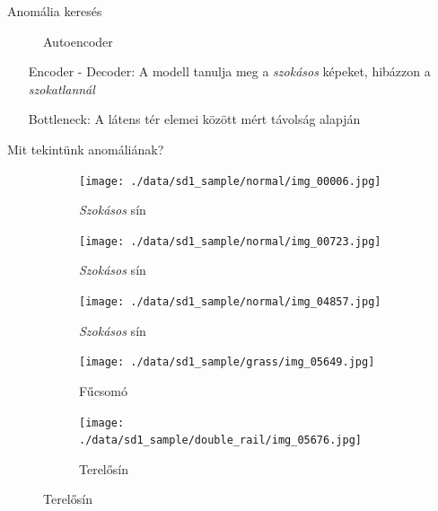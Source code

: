 \documentclass[aspectratio=169]{beamer}
\begin{document}
\begin{frame}{Anomália keresés}
\begin{figure}
\begin{subfigure}{0.2\textwidth}
        \end{subfigure}
        \caption*{Autoencoder\footnotemark}
    \end{figure}
    \begin{itemize}
        \setlength{\itemindent}{8em}
        \item [Encoder - Decoder:] A modell tanulja meg a \emph{szokásos} képeket, hibázzon a \emph{szokatlannál}
        \item [Bottleneck:] A látens tér elemei között mért távolság alapján
    \end{itemize}
\end{frame}

\begin{frame}{Mit tekintünk anomáliának?}
    \begin{figure}
        \centering
        \begin{subfigure}{0.3\textwidth}
            \centering
            \texttt{[image: ./data/sd1\_sample/normal/img\_00006.jpg]}
            \caption*{\emph{Szokásos} sín}
        \end{subfigure}
        \begin{subfigure}{0.3\textwidth}
            \centering
            \texttt{[image: ./data/sd1\_sample/normal/img\_00723.jpg]}
            \caption*{\emph{Szokásos} sín}
        \end{subfigure}
        \begin{subfigure}{0.3\textwidth}
            \centering
            \texttt{[image: ./data/sd1\_sample/normal/img\_04857.jpg]}
            \caption*{\emph{Szokásos} sín}
        \end{subfigure}
        \begin{subfigure}{0.3\textwidth}
            \centering
            \texttt{[image: ./data/sd1\_sample/grass/img\_05649.jpg]}
            \caption*{Fűcsomó}
        \end{subfigure}
        \begin{subfigure}{0.3\textwidth}
            \centering
            \texttt{[image: ./data/sd1\_sample/double\_rail/img\_05676.jpg]}
            \caption*{Terelősín}
        \end{subfigure}
    \end{figure}
\end{frame}
\end{document}
